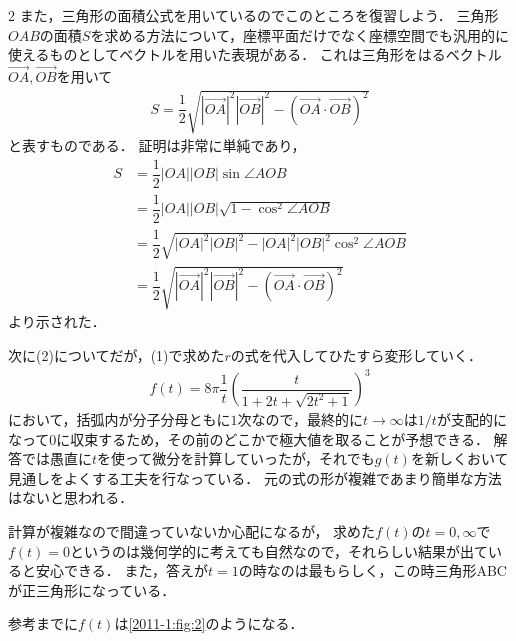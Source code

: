 \documentclass[../../main.tex]{subfiles}
\begin{document}
\begin{multicols}{2}
  また，三角形の面積公式を用いているのでこのところを復習しよう．
  三角形$OAB$の面積$S$を求める方法について，座標平面だけでなく座標空間でも汎用的に使えるものとしてベクトルを用いた表現がある．
  これは三角形をはるベクトル$\overrightarrow{OA},\overrightarrow{OB}$を用いて
  \begin{align}
    S = \dfrac{1}{2}\sqrt{|\overrightarrow{OA}|^2|\overrightarrow{OB}|^2-(\overrightarrow{OA}\cdot\overrightarrow{OB})^2}
  \end{align}
  と表すものである．
  証明は非常に単純であり，
  \begin{align}
    S
    & = \dfrac{1}{2}|OA||OB|\sin\angle AOB                                    \\
    & = \dfrac{1}{2}|OA||OB|\sqrt{1-\cos^2\angle AOB}                         \\
    & = \dfrac{1}{2}\sqrt{|OA|^2|OB|^2-|OA|^2|OB|^2\cos^2\angle AOB}          \\
    & = \dfrac{1}{2}\sqrt{|\overrightarrow{OA}|^2|\overrightarrow{OB}|^2-(\overrightarrow{OA}\cdot\overrightarrow{OB})^2}
  \end{align}
  より示された．

  次に(2)についてだが，(1)で求めた$r$の式を代入してひたすら変形していく．
  \begin{align}
    f(t) = 8\pi \dfrac{1}{t}\left(\dfrac{t}{1+2t+\sqrt{2t^2+1}}\right)^3
  \end{align}
  において，括弧内が分子分母ともに$1$次なので，最終的に$t\to\infty$は$1/t$が支配的になって$0$に収束するため，その前のどこかで極大値を取ることが予想できる．
  解答では愚直に$t$を使って微分を計算していったが，それでも$g(t)$を新しくおいて見通しをよくする工夫を行なっている．
  元の式の形が複雑であまり簡単な方法はないと思われる．

  計算が複雑なので間違っていないか心配になるが，
  求めた$f(t)$の$t=0,\infty$で$f(t)=0$というのは幾何学的に考えても自然なので，それらしい結果が出ていると安心できる．
  また，答えが$t=1$の時なのは最もらしく，この時三角形ABCが正三角形になっている．

  参考までに$f(t)$は\cref{2011-1:fig:2}のようになる．


\end{multicols}
\end{document}

